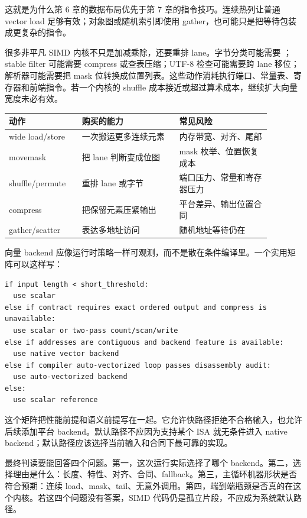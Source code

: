 这就是为什么第 6 章的数据布局优先于第 7 章的指令技巧。连续热列让普通 vector load 足够有效；对象图或随机索引即使用 gather，也可能只是把等待包装成更复杂的指令。

很多非平凡 SIMD 内核不只是加减乘除，还要重排 lane。字节分类可能需要 ；stable filter 可能需要 compress 或查表压缩；UTF-8 检查可能需要跨 lane 移位；解析器可能需要把 mask 位转换成位置列表。这些动作消耗执行端口、常量表、寄存器和前端指令。若一个内核的 shuffle 成本接近或超过算术成本，继续扩大向量宽度未必有效。

\begin{center}
\small
\begin{tabular}{@{}p{0.24\linewidth}p{0.33\linewidth}p{0.31\linewidth}@{}}
\toprule
动作 & 购买的能力 & 常见风险 \\
\midrule
wide load/store & 一次搬运更多连续元素 & 内存带宽、对齐、尾部 \\
movemask & 把 lane 判断变成位图 & mask 枚举、位置恢复成本 \\
shuffle/permute & 重排 lane 或字节 & 端口压力、常量和寄存器压力 \\
compress & 把保留元素压紧输出 & 平台差异、输出位置合同 \\
gather/scatter & 表达多地址访问 & 随机地址等待仍在 \\
\bottomrule
\end{tabular}
\end{center}

向量 backend 应像运行时策略一样可观测，而不是散在条件编译里。一个实用矩阵可以这样写：

\begin{lstlisting}[numbers=none,caption={SIMD backend 选择矩阵}]
if input length < short_threshold:
  use scalar
else if contract requires exact ordered output and compress is unavailable:
  use scalar or two-pass count/scan/write
else if addresses are contiguous and backend feature is available:
  use native vector backend
else if compiler auto-vectorized loop passes disassembly audit:
  use auto-vectorized backend
else:
  use scalar reference
\end{lstlisting}

这个矩阵把性能前提和语义前提写在一起。它允许快路径拒绝不合格输入，也允许后续添加平台 backend。默认路径不应因为支持某个 ISA 就无条件进入 native backend；默认路径应该选择当前输入和合同下最可靠的实现。

最终判读要能回答四个问题。第一，这次运行实际选择了哪个 backend。第二，选择理由是什么：长度、特性、对齐、合同、fallback。第三，主循环机器形状是否符合预期：连续 load、mask、tail、无意外调用。第四，端到端瓶颈是否真的在这个内核。若这四个问题没有答案，SIMD 代码仍是孤立片段，不应成为系统默认路径。

